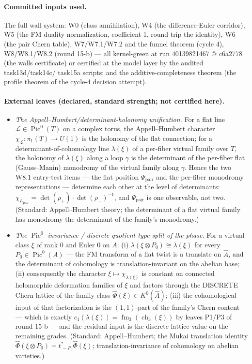 \documentclass[11pt]{article}
\newcommand{\ch}{\operatorname{ch}}
\newcommand{\Pic}{\operatorname{Pic}}
\newcommand{\KA}{A}
\newcommand{\KAd}{\widehat{A}}
\newcommand{\fm}{\operatorname{fm}}
\newcommand{\Phit}{\widehat\Phi}
\begin{document}
\paragraph{Committed inputs used.} The full wall system: W0 (class
annihilation), W4 (the difference-Euler corridor), W5 (the FM duality
normalization, coefficient 1, round trip the identity), W6 (the pair Chern
table), W7/W7.1/W7.2 and the funnel theorem (cycle 4), W8/W8.1/W8.2 (round
15-b) --- all kernel-green at run 40139821467 @ c6a2778 (the walls
certificate) or certified at the model layer by the audited task13d/task14c/
task15a scripts; and the additive-completeness theorem (the profile theorem
of the cycle-4 decision attempt).

\paragraph{External leaves (declared, standard strength; not certified
here).}
\begin{itemize}
\item[P5] \emph{The Appell--Humbert/determinant-holonomy unification.} For a
flat line $\mathcal{L}\in\Pic^0(T)$ on a complex torus, the Appell--Humbert
character $\chi_{\mathcal{L}}:\pi_1(T)\to U(1)$ is the holonomy of the flat
connection; for a determinant-of-cohomology line $\lambda(\xi)$ of a
per-fiber virtual family over $T$, the holonomy of $\lambda(\xi)$ along a
loop $\gamma$ is the determinant of the per-fiber flat
(Gauss--Manin) monodromy of the virtual family along $\gamma$. Hence the two
W8.1 entry-test items --- the flat position $\Psi_{\mathrm{pair}}$ and the
per-fiber monodromy representations --- determine each other at the level of
determinants: $\chi_{L_{\mathrm{pair}}} =
\det(\rho_+)\cdot\det(\rho_-)^{-1}$, and
$\Psi_{\mathrm{pair}}$ is one observable, not two. (Standard: Appell--Humbert
theory; the determinant of a flat virtual family has monodromy the
determinant of the family's monodromy.)
\item[P6] \emph{The $\Pic^0$-invariance / discrete-quotient type-split of the
phase.} For a virtual class $\xi$ of rank $0$ and Euler $0$ on $\KA$:
(i) $\lambda(\xi\otimes P_0) \cong \lambda(\xi)$ for every $P_0\in\Pic^0(\KA)$
--- the FM transform of a flat twist is a translate on $\KAd$, and the
determinant of cohomology is translation-invariant on the abelian base;
(ii) consequently the character $\xi \mapsto \chi_{\lambda(\xi)}$ is constant
on connected holomorphic deformation families of $\xi$ and factors through
the DISCRETE Chern lattice of the family class
$\Phit(\xi)\in K^0(\KAd)$; (iii) the cohomological input of that
factorization is the $(1,1)$-part of the family's Chern content --- which is
exactly $c_1(\lambda(\xi)) = \fm_3(\ch_3(\xi))$ by leaves P1/P3 of round 15-b
--- and the residual input is the discrete lattice value on the remaining
grades. (Standard: Appell--Humbert; the Mukai translation identity
$\Phit(\xi\otimes P_0) = t_{\,-P_0}^{*}\Phit(\xi)$; translation-invariance of
cohomology on abelian varieties.)
\end{itemize}
\end{document}
